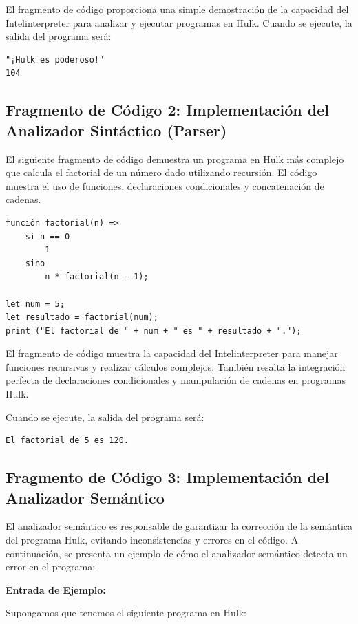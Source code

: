 \documentclass{article}
\begin{document}
El fragmento de código proporciona una simple demostración de la capacidad del Intelinterpreter para analizar y ejecutar programas en Hulk. Cuando se ejecute, la salida del programa será:

\begin{verbatim}
"¡Hulk es poderoso!"
104
\end{verbatim}

\subsection{Fragmento de Código 2: Implementación del Analizador Sintáctico (Parser)}

El siguiente fragmento de código demuestra un programa en Hulk más complejo que calcula el factorial de un número dado utilizando recursión. El código muestra el uso de funciones, declaraciones condicionales y concatenación de cadenas.

\begin{verbatim}
función factorial(n) =>
    si n == 0
        1
    sino
        n * factorial(n - 1);

let num = 5;
let resultado = factorial(num);
print ("El factorial de " + num + " es " + resultado + ".");
\end{verbatim}

El fragmento de código muestra la capacidad del Intelinterpreter para manejar funciones recursivas y realizar cálculos complejos. También resalta la integración perfecta de declaraciones condicionales y manipulación de cadenas en programas Hulk.

Cuando se ejecute, la salida del programa será:

\begin{verbatim}
El factorial de 5 es 120.
\end{verbatim}

\subsection{Fragmento de Código 3: Implementación del Analizador Semántico}

El analizador semántico es responsable de garantizar la corrección de la semántica del programa Hulk, evitando inconsistencias y errores en el código. A continuación, se presenta un ejemplo de cómo el analizador semántico detecta un error en el programa:

\textbf{Entrada de Ejemplo:}

Supongamos que tenemos el siguiente programa en Hulk:
\end{document}
